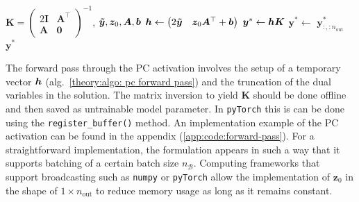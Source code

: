\begin{algorithm}
	\caption{Forward pass of the physics-constrained activation function.}
	\label{theory:algo: pc forward pass}
	\begin{algorithmic}
		\REQUIRE $\bm{K} = 
            \begin{pmatrix}
                2 \bm{I} & \bm{A}^\top  \\
                \bm{A} & \bm{0}   
            \end{pmatrix} ^{-1} $,
                $\bm{\tilde{y}}, {\bm{z}}_{0}, \bm{A}, \bm{b}$
		\STATE $\bm{h} \leftarrow 
            \begin{pmatrix}
                2 \bm{\tilde{y}} & \bm{z}_0 \bm{A}^\top + {\bm{b}}
            \end{pmatrix}$
        \STATE $\bm{y}^* \leftarrow {\bm{h}} \bm{K}$
        \STATE $\bm{y}^* \leftarrow $ $\bm{y}^*_{:,:n_\text{out}}$
        \RETURN $\bm{y}^*$
	\end{algorithmic}
\end{algorithm}

\noindent
The forward pass through the PC activation involves the setup of a temporary vector ${\bm{h}}$ (alg.~\ref{theory:algo: pc forward pass})
and the truncation of the dual variables in the solution. The matrix inversion to yield $\bm{K}$ should be done 
offline and then saved as untrainable model parameter. In \texttt{pyTorch} this is can be done using the
\texttt{register\_buffer()} method. An implementation example of the PC activation can be found in the appendix (\ref{app:code:forward-pass}).
For a straightforward implementation, the formulation appears in such a way that it supports batching of 
a certain batch size $n_\mathcal{B}$.
Computing frameworks that support broadcasting such as \texttt{numpy} or
\texttt{pyTorch} allow the implementation of $\bm{z}_0$ in the shape of $1 \times n_\text{out}$ to reduce memory usage as long as it remains constant.